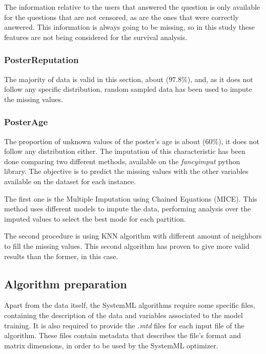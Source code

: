 \documentclass[11pt]{book} %
\begin{document}
      The information relative to the users that answered the question is only available for the questions that are not censored, as are the ones that were correctly answered. This information is always going to be missing, so in this study these features are not being considered for the survival analysis.

    \subsubsection{PosterReputation}

      The majority of data is valid in this section, about ($97.8\%$), and, as it does not follow any specific distribution, random sampled data has been used to impute the missing values.

    \subsubsection{PosterAge}

      The proportion of unknown values of the poster's age is about ($60\%$), it does not follow any distribution either. The imputation of this characteristic has been done comparing two different methods, available on the \emph{fancyimput} python library. The objective is to predict the missing values with the other variables available on the dataset for each instance.

      The first one is the Multiple Imputation using Chained Equations (MICE). This method uses different models to impute the data, performing analysis over the imputed values to select the best mode for each partition.

      The second procedure is using KNN algorithm with different amount of neighbors to fill the missing values. This second algorithm has proven to give more valid results than the former, in this case.

  \subsection{Algorithm preparation}

    Apart from the data itself, the SystemML algorithms require some specific files, containing the description of the data and variables associated to the model training. It is also required to provide the \emph{.mtd} files for each input file of the algorithm. These files contain metadata that describes the file's format and matrix dimensions, in order to be used by the SystemML optimizer.
\end{document}
